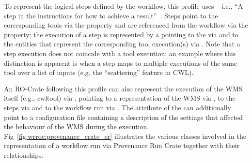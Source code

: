 To represent the logical steps defined by the workflow, this profile uses  -- i.e., “A step in the instructions for how to achieve a result”~\cite{howtostep-def}.
Steps point to the corresponding tools via the  property and are referenced from the workflow via the  property; the execution of a step is represented by a  pointing to the
 via  and to the 
entities that represent the corresponding tool execution(s) via
.
Note that a step execution does not coincide with a tool execution: an example where this distinction is apparent is when a step maps to multiple executions of the same tool over a list of inputs (e.g. the ``scattering'' feature in CWL).

An RO-Crate following this profile can also represent the execution of the WMS itself (e.g., cwltool) via
, pointing to a representation of the WMS via
, to the steps via  and to the workflow run via .
The  attribute of the
 can additionally point to a configuration file containing a description of the settings that affected the behaviour of the WMS during the execution.
%
Fig~\ref{fig:wrroc:provenance_crate_er} illustrates the various classes involved in the representation of a workflow run via Provenance Run Crate together with their relationships.

